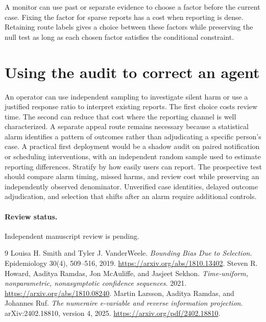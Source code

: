 \documentclass[11pt]{article}
\begin{document}
A monitor can use past or separate evidence to choose a factor
before the current case. Fixing the factor for sparse reports
has a cost when reporting is dense. Retaining route labels gives
a choice between these factors while preserving the null test
as long as each chosen factor satisfies the conditional constraint.

\section{Using the audit to correct an agent}
An operator can use independent sampling to investigate
silent harm or use a justified response ratio to interpret existing
reports. The first choice costs review time. The second can reduce
that cost where the reporting channel is well characterized.
A separate appeal route remains necessary because a statistical
alarm identifies a pattern of outcomes rather than adjudicating
a specific person's case. A practical first deployment would be
a shadow audit on paired notification or scheduling interventions,
with an independent random sample used to estimate reporting
differences. Stratify by how easily users can report. The
prospective test should compare alarm timing, missed harms, and
review cost while preserving an independently observed denominator.
Unverified case identities, delayed outcome adjudication, and
selection that shifts after an alarm require additional controls.

\paragraph{Review status.} Independent manuscript review is pending.

\begin{thebibliography}{9}
Louisa H. Smith and Tyler J. VanderWeele.
\emph{Bounding Bias Due to Selection}. Epidemiology 30(4),
509--516, 2019. \url{https://arxiv.org/abs/1810.13402}.
Steven R. Howard, Aaditya Ramdas, Jon McAuliffe, and Jasjeet Sekhon.
\emph{Time-uniform, nonparametric, nonasymptotic confidence sequences}.
2021. \url{https://arxiv.org/abs/1810.08240}.
Martin Larsson, Aaditya Ramdas, and Johannes Ruf.
\emph{The numeraire e-variable and reverse information projection}.
arXiv:2402.18810, version 4, 2025.
\url{https://arxiv.org/pdf/2402.18810}.
\end{thebibliography}
\end{document}
